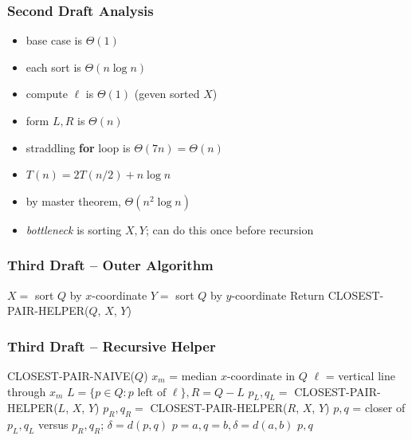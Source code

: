 \documentclass{beamer}
\begin{document}
\begin{frame} \frametitle{Second Draft Analysis}
\begin{itemize}
  \item base case is $\Theta(1)$
  \item each sort is $\Theta(n \log n)$
  \item compute $\ell$ is $\Theta(1)$ (geven sorted $X$)
  \item form $L, R$ is $\Theta(n)$
  \item straddling \textbf{for} loop is $\Theta(7n) = \Theta(n)$
  \item $T(n) = 2 T(n/2) + n \log n$
  \item by master theorem, $\Theta(n^2 \log n)$
  \item \emph{bottleneck} is sorting $X, Y$; can do this once before recursion
\end{itemize}
\end{frame}

\begin{frame} \frametitle{Third Draft -- Outer Algorithm}
\begin{algorithmic}[1]
    \State $X = $ sort $Q$ by $x$-coordinate
    \State $Y = $ sort $Q$ by $y$-coordinate
    \State Return CLOSEST-PAIR-HELPER($Q$, $X$, $Y$)
  \EndFunction
\end{algorithmic}
\end{frame}

\begin{frame} \frametitle{Third Draft -- Recursive Helper}
  {\footnotesize
\begin{algorithmic}[1]
      \State \Return CLOSEST-PAIR-NAIVE($Q$)
    \Else
      \State $x_m$ = median $x$-coordinate in $Q$
      \State $\ell$ = vertical line through $x_m$
      \State $L = \{p \in Q : p \text{ left of } \ell\}, R = Q-L$
      \State $p_L, q_L = $ CLOSEST-PAIR-HELPER($L$, $X$, $Y$)
      \State $p_R, q_R = $ CLOSEST-PAIR-HELPER($R$, $X$, $Y$)
      \State $p, q$ = closer of $p_L, q_L$ versus $p_R, q_R$; $\delta=d(p,q)$
            \State $p=a, q=b, \delta=d(a,b)$
          \EndIf
        \EndFor
      \EndFor
      \State \Return $p, q$
    \EndIf
  \EndFunction
\end{algorithmic}
}
\end{frame}
\end{document}
